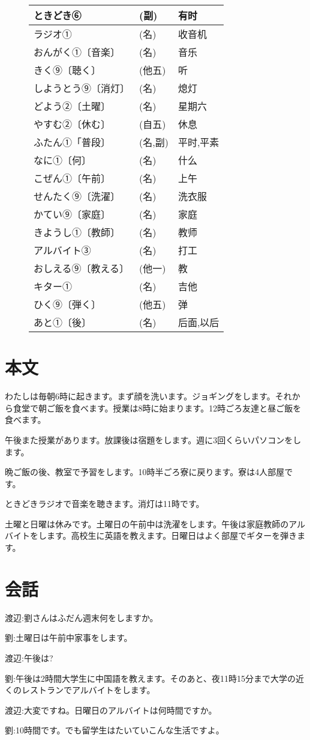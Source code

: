\begin{figure}[htbp]
\begin{tabular}{l|l|l}
            ときどき⑥ & (副) & 有时\\\hline
            ラジオ① & (名) & 收音机\\\hline
            おんがく①〔音楽〕 & (名) & 音乐\\\hline
            きく⑨〔聴く〕 & (他五) & 听\\\hline
            しようとう⑨〔消灯〕 & (名) & 熄灯\\\hline
            どよう②〔土曜〕 & (名) & 星期六\\\hline
            やすむ②〔休む〕 & (自五) & 休息\\\hline
            ふたん①「普段〕 & (名,副) & 平时,平素\\\hline
            なに①〔何〕 & (名) & 什么\\\hline
            こぜん①〔午前〕 & (名) & 上午\\\hline
            せんたく⑨〔洗濯〕 & (名) & 洗衣服\\\hline
            かてい⑨〔家庭〕 & (名) & 家庭\\\hline
            きようし①〔教師〕 & (名) & 教师\\\hline
            アルバイト③ & (名) & 打工\\\hline
            おしえる⑨〔教える〕 & (他一) & 教\\\hline
            キター① & (名) & 吉他\\\hline
            ひく⑨〔弾く〕 & (他五) & 弹\\\hline
            あと①〔後〕 & (名) & 后面,以后\\\hline
        \end{tabular}
    \end{figure}
    \section{本文}
        わたしは毎朝6時に起きます。まず顔を洗います。ジョギングをします。それから食堂で朝ご飯を食べます。授業は8時に始まります。12時ごろ友達と昼ご飯を食べます。

        午後また授業があります。放課後は宿題をします。週に3回くらいパソコンをします。

        晩ご飯の後、教室で予習をします。10時半ごろ寮に戻ります。寮は4人部屋です。

        ときどきラジオで音楽を聴きます。消灯は11時です。

        土曜と日曜は休みです。土曜日の午前中は洗濯をします。午後は家庭教師のアルバイトをします。高校生に英語を教えます。日曜日はよく部屋でギターを弾きます。
    \section{会話}
    渡辺:劉さんはふだん週末何をしますか。

    劉:土曜日は午前中家事をします。

    渡辺:午後は?

    劉:午後は2時間大学生に中国語を教えます。そのあと、夜11時15分まで大学の近くのレストランでアルバイトをします。

    渡辺:大変ですね。日曜日のアルバイトは何時間ですか。

    劉:10時間です。でも留学生はたいていこんな生活ですよ。

